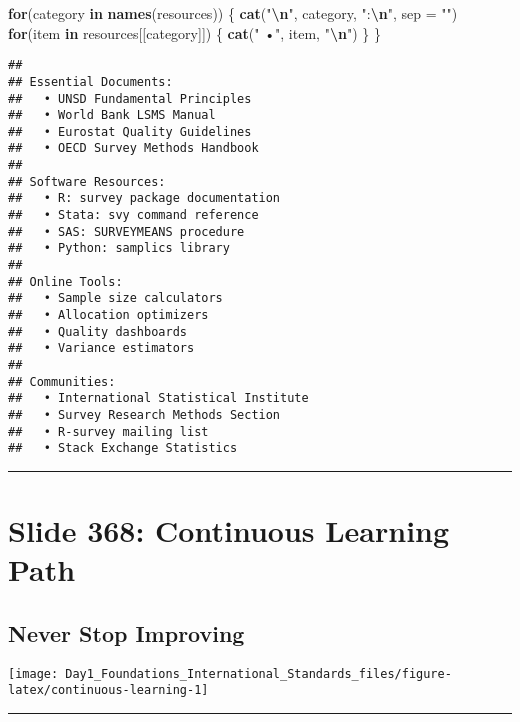 \documentclass[
]{article}
\newenvironment{Shaded}{\begin{snugshade}}{\end{snugshade}}
\newcommand{\AttributeTok}[1]{\textcolor[rgb]{0.13,0.29,0.53}{#1}}
\newcommand{\ControlFlowTok}[1]{\textcolor[rgb]{0.13,0.29,0.53}{\textbf{#1}}}
\newcommand{\FunctionTok}[1]{\textcolor[rgb]{0.13,0.29,0.53}{\textbf{#1}}}
\newcommand{\NormalTok}[1]{#1}
\newcommand{\SpecialCharTok}[1]{\textcolor[rgb]{0.81,0.36,0.00}{\textbf{#1}}}
\newcommand{\StringTok}[1]{\textcolor[rgb]{0.31,0.60,0.02}{#1}}
\begin{document}
\begin{Shaded}
\begin{Highlighting}[]
\ControlFlowTok{for}\NormalTok{(category }\ControlFlowTok{in} \FunctionTok{names}\NormalTok{(resources)) \{}
  \FunctionTok{cat}\NormalTok{(}\StringTok{"}\SpecialCharTok{\textbackslash{}n}\StringTok{"}\NormalTok{, category, }\StringTok{":}\SpecialCharTok{\textbackslash{}n}\StringTok{"}\NormalTok{, }\AttributeTok{sep =} \StringTok{""}\NormalTok{)}
  \ControlFlowTok{for}\NormalTok{(item }\ControlFlowTok{in}\NormalTok{ resources[[category]]) \{}
    \FunctionTok{cat}\NormalTok{(}\StringTok{"  •"}\NormalTok{, item, }\StringTok{"}\SpecialCharTok{\textbackslash{}n}\StringTok{"}\NormalTok{)}
\NormalTok{  \}}
\NormalTok{\}}
\end{Highlighting}
\end{Shaded}

\begin{verbatim}
## 
## Essential Documents:
##   • UNSD Fundamental Principles 
##   • World Bank LSMS Manual 
##   • Eurostat Quality Guidelines 
##   • OECD Survey Methods Handbook 
## 
## Software Resources:
##   • R: survey package documentation 
##   • Stata: svy command reference 
##   • SAS: SURVEYMEANS procedure 
##   • Python: samplics library 
## 
## Online Tools:
##   • Sample size calculators 
##   • Allocation optimizers 
##   • Quality dashboards 
##   • Variance estimators 
## 
## Communities:
##   • International Statistical Institute 
##   • Survey Research Methods Section 
##   • R-survey mailing list 
##   • Stack Exchange Statistics
\end{verbatim}

\begin{center}\rule{0.5\linewidth}{0.5pt}\end{center}

\section{Slide 368: Continuous Learning
Path}\label{slide-368-continuous-learning-path}

\subsection{Never Stop Improving}\label{never-stop-improving}

\texttt{[image: Day1\_Foundations\_International\_Standards\_files/figure-latex/continuous-learning-1]}

\begin{center}\rule{0.5\linewidth}{0.5pt}\end{center}
\end{document}

